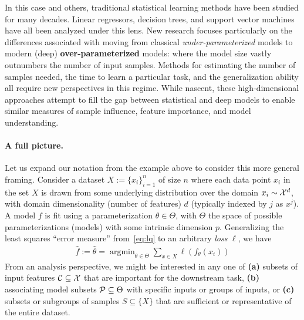 In this case and others, traditional statistical learning methods 
have been studied 
for many decades.
Linear regressors, decision trees, and support vector machines
have all been analyzed under this lens.
New research focuses
particularly on the differences
associated with moving from classical \textit{under-parameterized} models to
modern (deep) \textbf{over-parameterized} models: where
the model size vastly outnumbers the number
of input samples.
Methods for estimating the number of samples needed,
the time to learn a particular task,
and the generalization ability 
all require new perspectives in this regime.
While nascent, these high-dimensional approaches
attempt to fill the gap between
statistical and deep models to enable similar measures of sample influence, feature importance, and model understanding. 

\paragraph{A full picture.}
Let us expand our notation from the example above to consider this more general framing.
Consider a dataset $X:=\{x_i\}_{i=1}^n$ of size $n$ where each data point $x_i$ in the set $X$ is drawn from some underlying distribution over the domain $x_i \sim \mathcal{X}^d$, 
with domain dimensionality (number of features) $d$ (typically indexed by $j$ as $x^j$).
A model $f$ is fit using a parameterization $\theta \in \Theta$,
with $\Theta$ the space of possible parameterizations (models) with some intrinsic dimension $p$. 
Generalizing the least squares ``error measure'' from~\eqref{eq:lq} to an arbitrary \textit{loss} $\ell$, we have
\begin{align}\label{eq:learning}
    \hat{f}:=\hat{\theta} = \mathop{\arg\min}_{\theta\in\Theta} \sum_{x \in X} \ell(f_\theta(x_i))
\end{align}
From an analysis perspective, 
we might be interested in any one of 
\textbf{(a)} subsets of input features $\mathcal{C} \subseteq \mathcal{X}$ that are important for the downstream task,
\textbf{(b)} associating model subsets $\mathcal{P} \subseteq \Theta$ with specific inputs or groups of inputs, or 
\textbf{(c)} subsets or subgroups of samples $S \subseteq \{X\}$ that are sufficient or representative of the entire dataset.

